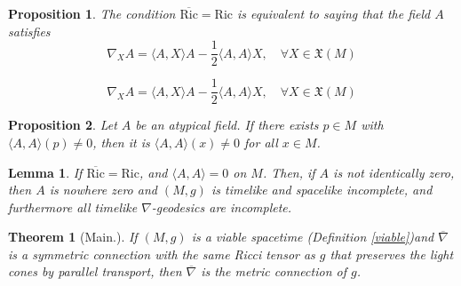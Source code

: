 \documentclass[10pt,a4paper]{amsart}
\newtheorem{proposition}{Proposition}
\newtheorem{lemma}{Lemma}
\newtheorem{theorem}{Theorem}
\begin{document}
\begin{proposition}
\label{0.5.3} The condition $\overline{\mathrm{Ric}}=\mathrm{Ric}$ is
equivalent to saying that the field $A$ satisfies%
\begin{equation}
\nabla_{X}A=\langle A,X\rangle A-\frac{1}{2}\langle A,A\rangle X,\quad\forall
X\in\mathfrak{X}(M)\label{ATP}%
\end{equation}

\end{proposition}

\begin{equation}
\nabla_{X}A=\langle A,X\rangle A-\frac{1}{2}\langle A,A\rangle X,\quad\forall
X\in\mathfrak{X}(M) \label{atp}%
\end{equation}

\begin{proposition}
\label{1.2}Let $A$ be an atypical field. If there exists $p\in M$ with
$\langle A,A\rangle(p)\neq0$, then it is $\langle A,A\rangle(x)\neq0$ for all
$x\in M$.
\end{proposition}

\begin{lemma}
\label{1.6}If $\overline{\mathrm{Ric}}=\mathrm{Ric}$, and $\langle
A,A\rangle=0$ on $M$. Then, if $A$ is not identically zero, then $A$ is
nowhere zero and $(M,g)$ is timelike and spacelike incomplete, and furthermore
all timelike $\nabla$-geodesics are incomplete.
\end{lemma}

\begin{theorem}
[Main.]\label{1.8}If $\left(  M,g\right)  $ is a viable spacetime (Definition
\ref{viable})and $\overline{\nabla}$ is a symmetric connection with the same
Ricci tensor as $g$ that preserves the light cones by parallel transport, then
$\overline{\nabla}$ is the metric connection of $g$.
\end{theorem}
\end{document}
